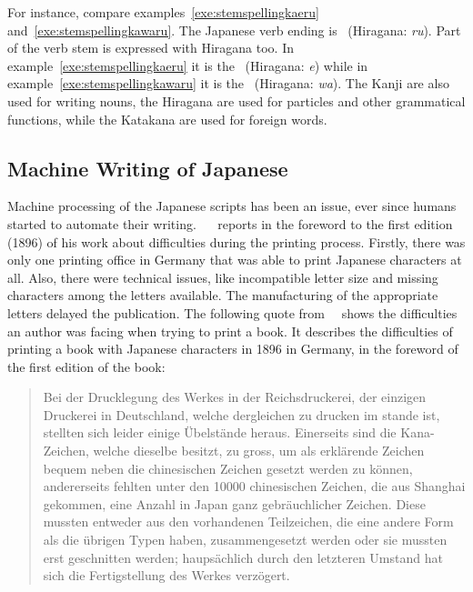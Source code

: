 For instance, compare examples~\ref{exe:stemspellingkaeru}
and~\ref{exe:stemspellingkawaru}. 
The Japanese verb ending is 
~(Hiragana: \emph{ru}). Part of the verb stem is expressed with
Hiragana too. In example~\ref{exe:stemspellingkaeru} it is the 
~(Hiragana: \emph{e}) while in example~\ref{exe:stemspellingkawaru} 
it is the ~(Hiragana: \emph{wa}).
The Kanji are also used for writing nouns, the Hiragana are used for particles 
and other grammatical functions, while the Katakana are used for foreign words.


\subsection{Machine Writing of Japanese}
\label{sec:machinewritingofjapanese}

Machine processing of the Japanese scripts has been an issue, ever since humans
started to automate their writing. 
~~\citeyear{Lange1922} reports in the foreword to the 
first edition (1896) of his work about difficulties during the printing process. 
Firstly, there was only one printing office in Germany that was able to print 
Japanese characters at all. Also, there were technical issues, 
like incompatible letter size and missing characters among the letters 
available. The manufacturing of the appropriate letters delayed the publication.
The following quote from~~\citeyear{Lange1922} shows the 
difficulties an author was facing when trying to print a book. 
It describes the difficulties of printing a book with Japanese characters
in 1896 in Germany, in the foreword of the first edition of the book:
\begin{quote}
Bei der Drucklegung des Werkes in der Reichsdruckerei, der einzigen Druckerei 
in Deutschland, welche dergleichen zu drucken im stande ist, stellten sich 
leider einige Übelstände heraus. Einerseits sind die Kana-Zeichen, 
welche dieselbe besitzt, zu gross, um als erklärende Zeichen bequem neben die 
chinesischen Zeichen gesetzt werden zu können, andererseits fehlten unter den 
10000 chinesischen Zeichen, die aus Shanghai gekommen, eine Anzahl in Japan 
ganz gebräuchlicher Zeichen. 
Diese mussten entweder aus den vorhandenen Teilzeichen,
die eine andere Form als die übrigen Typen haben, zusammengesetzt werden oder 
sie mussten erst geschnitten werden; 
haupsächlich durch den letzteren Umstand hat sich die Fertigstellung des Werkes 
verzögert.\\
\end{quote}

